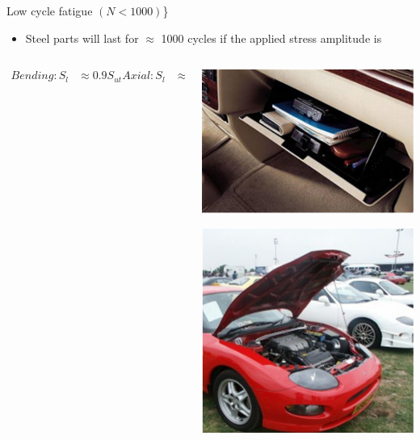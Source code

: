 \documentclass[10pt, svgnames]{beamer}
\begin{document}
\begin{frame}[label={sec:org2f76b9c}]{Low cycle fatigue \((N < 1000)\)\}}
\begin{itemize}
\item Steel parts will last for \(\approx\) 1000 cycles if the applied stress amplitude is
\end{itemize}

\begin{columns}
\begin{column}{0.5\columnwidth}
\begin{align*}
Bending: S_l &\approx 0.9S_{ut}
Axial: S_l &\approx 0.75S_{ut}
Torsion: S_l &\approx 0.72S_{ut}
\end{align*}
\end{column}

\begin{column}{0.5\columnwidth}
\begin{center}
\includegraphics[width=.9\linewidth]{pictures/glove-comp.pdf}
\end{center}
\begin{center}
\includegraphics[width=.9\linewidth]{pictures/car-hood.pdf}
\end{center}
\end{column}
\end{columns}
\end{frame}
\end{document}
